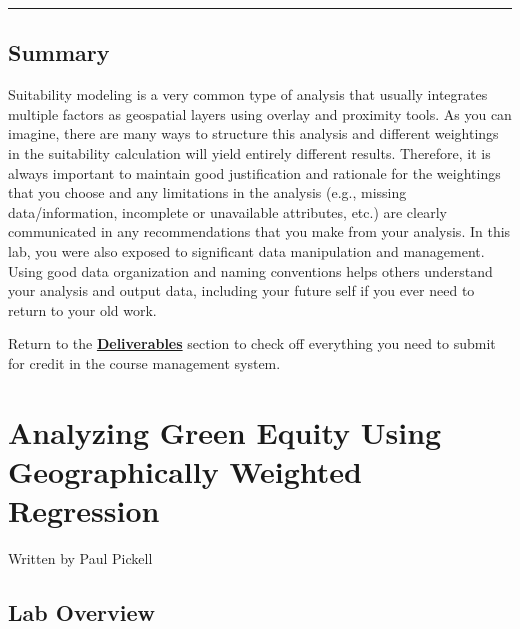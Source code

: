 \documentclass[
]{book}
\begin{document}
\begin{center}\rule{0.5\linewidth}{0.5pt}\end{center}

\hypertarget{summary-3}{%
\section*{Summary}\label{summary-3}}

Suitability modeling is a very common type of analysis that usually integrates multiple factors as geospatial layers using overlay and proximity tools. As you can imagine, there are many ways to structure this analysis and different weightings in the suitability calculation will yield entirely different results. Therefore, it is always important to maintain good justification and rationale for the weightings that you choose and any limitations in the analysis (e.g., missing data/information, incomplete or unavailable attributes, etc.) are clearly communicated in any recommendations that you make from your analysis. In this lab, you were also exposed to significant data manipulation and management. Using good data organization and naming conventions helps others understand your analysis and output data, including your future self if you ever need to return to your old work.

Return to the \textbf{\protect\hyperlink{lab5-deliverables}{Deliverables}} section to check off everything you need to submit for credit in the course management system.

\hypertarget{geographically-weighted-regression}{%
\chapter{Analyzing Green Equity Using Geographically Weighted Regression}\label{geographically-weighted-regression}}

Written by
Paul Pickell

\hypertarget{lab-overview-4}{%
\section*{Lab Overview}\label{lab-overview-4}}
\end{document}
